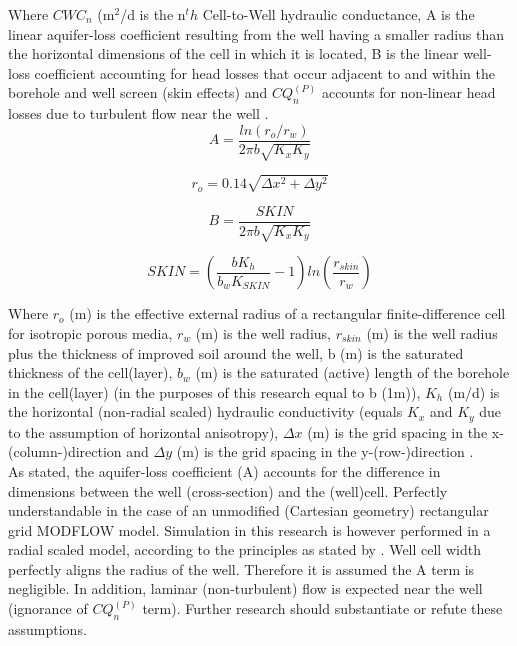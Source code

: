 Where $CWC_n$ (m$^2$/d is the n$^th$ Cell-to-Well hydraulic conductance, A is the linear aquifer-loss coefficient resulting from the well having a smaller radius than the horizontal dimensions of the cell in which it is located, B is the linear well-loss coefficient accounting for head losses that occur adjacent to and within the borehole and well screen (skin effects) and $CQ_{n}^{(P)}$ accounts for non-linear head losses due to turbulent flow near the well \citep{LeonardF.KonikowGeorgeZ.HornbergerKeithJ.Halford2009}. \\

\begin{equation}
 A = \frac{ln(r_{o}/r_{w})}{2\pi b \sqrt{K_{x}K_{y}}}
\label{eq:A}
\end{equation}

\begin{equation}
 r_o = 0.14 \sqrt{\Delta x^2 + \Delta y^2}
\label{eq:r_o}
\end{equation}

\begin{equation}
 B = \frac{SKIN}{2\pi b \sqrt{K_{x}K_{y}}}
\label{eq:B}
\end{equation}   

\begin{equation}
 SKIN = {(\frac{bK_{h}}{b_{w}K_{SKIN}}-1)} ln(\frac{r_{skin}}{r_{w}})
\label{eq:SKIN}
\end{equation}   

Where $r_{o}$ (m) is the effective external radius of a rectangular finite-difference cell for isotropic porous media, $r_{w}$ (m) is the well radius, $r_{skin}$ (m) is the well radius plus the thickness of improved soil around the well, b (m) is the saturated thickness of the cell(layer), $b_{w}$ (m) is the saturated (active) length of the borehole in the cell(layer) (in the purposes of this research equal to b (1m)), $K_{h}$ (m/d) is the horizontal (non-radial scaled) hydraulic conductivity (equals $K_{x}$ and $K_{y}$ due to the assumption of horizontal anisotropy), $\Delta x$ (m) is the grid spacing in the x-(column-)direction and $\Delta y$ (m) is the grid spacing in the y-(row-)direction \citep{LeonardF.KonikowGeorgeZ.HornbergerKeithJ.Halford2009}. \\

As stated, the aquifer-loss coefficient (A) accounts for the difference in dimensions between the well (cross-section) and the (well)cell. Perfectly understandable in the case of an unmodified (Cartesian geometry) rectangular grid MODFLOW model. Simulation in this research is however performed in a radial scaled model, according to the principles as stated by \citet{Langevin2008}. Well cell width perfectly aligns the radius of the well. Therefore it is assumed the A term is negligible. In addition, laminar (non-turbulent) flow is expected near the well (ignorance of $CQ_{n}^{(P)}$ term). Further research should substantiate or refute these assumptions. \\


